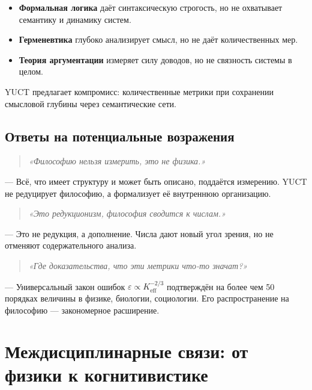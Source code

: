 \documentclass[12pt,a4paper]{article}
\newcommand{\eps}{\varepsilon}
\begin{document}
	\begin{itemize}
		\item \textbf{Формальная логика} даёт синтаксическую строгость, но не охватывает семантику и динамику систем.
		\item \textbf{Герменевтика} глубоко анализирует смысл, но не даёт количественных мер.
		\item \textbf{Теория аргументации} измеряет силу доводов, но не связность системы в целом.
	\end{itemize}
	YUCT предлагает компромисс: количественные метрики при сохранении смысловой глубины через семантические сети.
	
	\subsection{Ответы на потенциальные возражения}
	
	\begin{quote}
		\textit{«Философию нельзя измерить, это не физика.»}
	\end{quote}
	— Всё, что имеет структуру и может быть описано, поддаётся измерению. YUCT не редуцирует философию, а формализует её внутреннюю организацию.
	
	\begin{quote}
		\textit{«Это редукционизм, философия сводится к числам.»}
	\end{quote}
	— Это не редукция, а дополнение. Числа дают новый угол зрения, но не отменяют содержательного анализа.
	
	\begin{quote}
		\textit{«Где доказательства, что эти метрики что-то значат?»}
	\end{quote}
	— Универсальный закон ошибок \(\eps \propto K_{\mathrm{eff}}^{-2/3}\) подтверждён на более чем 50 порядках величины в физике, биологии, социологии. Его распространение на философию — закономерное расширение.
	
	\section{Междисциплинарные связи: от физики к когнитивистике}
	\label{sec:interdisciplinary}
	
\end{document}
